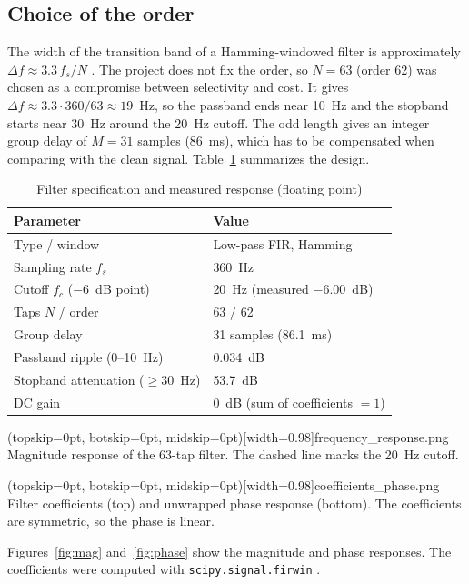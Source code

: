 \documentclass{ieeeaccess}
\begin{document}
\subsection{Choice of the order}
The width of the transition band of a Hamming-windowed filter is approximately $\Delta f \approx 3.3\,f_s/N$ \cite{b1}. The project does not fix the order, so $N=63$ (order 62) was chosen as a compromise between selectivity and cost. It gives $\Delta f \approx 3.3\cdot 360/63 \approx 19$~Hz, so the passband ends near 10~Hz and the stopband starts near 30~Hz around the 20~Hz cutoff. The odd length gives an integer group delay of $M=31$ samples (86~ms), which has to be compensated when comparing with the clean signal. Table~\ref{tab:spec} summarizes the design.

\begin{table}[!t]
\caption{Filter specification and measured response (floating point)}
\label{tab:spec}
\centering
\begin{tabular}{ll}
\toprule
Parameter & Value \\
\midrule
Type / window & Low-pass FIR, Hamming \\
Sampling rate $f_s$ & 360~Hz \\
Cutoff $f_c$ ($-6$~dB point) & 20~Hz (measured $-6.00$~dB) \\
Taps $N$ / order & 63 / 62 \\
Group delay & 31 samples (86.1~ms) \\
Passband ripple (0--10~Hz) & 0.034~dB \\
Stopband attenuation ($\ge$30~Hz) & 53.7~dB \\
DC gain & 0~dB (sum of coefficients $=1$) \\
\bottomrule
\end{tabular}
\end{table}

\Figure[t!](topskip=0pt, botskip=0pt, midskip=0pt)[width=0.98\columnwidth]{frequency_response.png}
{Magnitude response of the 63-tap filter. The dashed line marks the 20~Hz cutoff.\label{fig:mag}}

\Figure[t!](topskip=0pt, botskip=0pt, midskip=0pt)[width=0.98\columnwidth]{coefficients_phase.png}
{Filter coefficients (top) and unwrapped phase response (bottom). The coefficients are symmetric, so the phase is linear.\label{fig:phase}}

Figures~\ref{fig:mag} and~\ref{fig:phase} show the magnitude and phase responses. The coefficients were computed with \texttt{scipy.signal.firwin} \cite{b5}.
\end{document}
